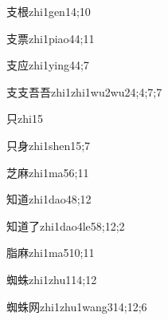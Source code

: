 \begin{verbete}{支根}{zhi1gen1}{4;10}
\end{verbete}

\begin{verbete}{支票}{zhi1piao4}{4;11}
\end{verbete}

\begin{verbete}{支应}{zhi1ying4}{4;7}
\end{verbete}

\begin{verbete}{支支吾吾}{zhi1zhi1wu2wu2}{4;4;7;7}
\end{verbete}

\begin{verbete}{只}{zhi1}{5}
\end{verbete}

\begin{verbete}{只身}{zhi1shen1}{5;7}
\end{verbete}

\begin{verbete}{芝麻}{zhi1ma5}{6;11}
\end{verbete}

\begin{verbete}{知道}{zhi1dao4}{8;12}
\end{verbete}

\begin{verbete}{知道了}{zhi1dao4le5}{8;12;2}
\end{verbete}

\begin{verbete}{脂麻}{zhi1ma5}{10;11}
\end{verbete}

\begin{verbete}{蜘蛛}{zhi1zhu1}{14;12}
\end{verbete}

\begin{verbete}{蜘蛛网}{zhi1zhu1wang3}{14;12;6}
\end{verbete}

